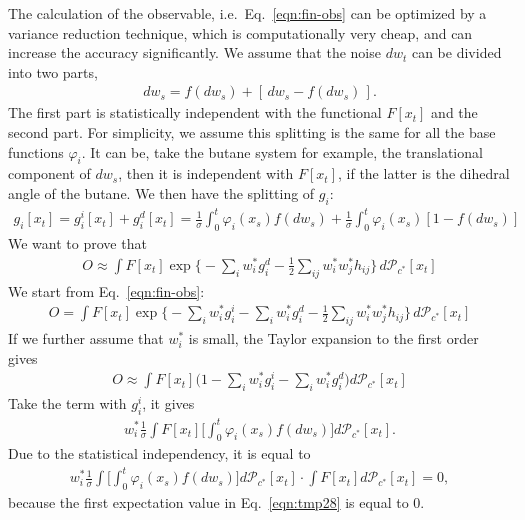 \documentclass[aip,jcp,a4paper,reprint,onecolumn]{revtex4-1}
\newcommand{\pathmeas}{d\mathcal P}
\begin{document}
The calculation of the observable, i.e.~Eq.~\eqref{eqn:fin-obs} can be
optimized by a variance reduction technique, which is computationally
very cheap, and can increase the accuracy significantly. We assume
that the noise $dw_t$ can be divided into two parts,
\begin{align}
  dw_s = f(dw_s) + [\,dw_s - f(dw_s)\,].
\end{align}
The first part is statistically independent with the functional
$F[x_t]$ and the second part. For simplicity, we assume this splitting
is the same for all the base functions $\varphi_i$. It can be, take the
butane system for example, the translational component of $dw_s$, then
it is independent with $F[x_t]$, if the latter is the dihedral angle
of the butane.  We then have the splitting of $g_i$:
\begin{align}
  g_i[x_t]
  = g_i^i[x_t] + g_i^d[x_t]
  = \frac1\sigma\int_0^t\varphi_i(x_s) f(dw_s)
  + \frac1\sigma\int_0^t\varphi_i(x_s) [1 - f(dw_s)]
\end{align}
We want to prove that
\begin{align}\label{eqn:o-approx}
  O \approx \int F[x_t]
  \exp\Big\{
  -\sum_iw^\ast_i g^d_i -\frac12\sum_{ij}w^\ast_iw^\ast_jh_{ij}
  \Big\}\,
  \pathmeas_{c^\ast}[x_t]    
\end{align}
We start from Eq.~\eqref{eqn:fin-obs}:
\begin{align}
  O = \int F[x_t]
  \exp\Big\{
  -\sum_i w^\ast_ig^i_i
  -\sum_iw^\ast_i g^d_i -\frac12\sum_{ij}w^\ast_iw^\ast_jh_{ij}
  \Big\}\,
  \pathmeas_{c^\ast}[x_t]  
\end{align}
If we further assume that $w_i^\ast$ is small, the Taylor expansion to
the first order gives
\begin{align}
  O \approx \int F[x_t]
  \Big( 1 - \sum_i w_i^\ast g_i^i   -\sum_iw^\ast_i g^d_i\Big)
  \pathmeas_{c^\ast}[x_t]    
\end{align}
Take the term with $g_i^i$, it gives
\begin{align}
  w_i^\ast \frac1\sigma
  \int F[x_t] 
  \Big[ \int_0^t\varphi_i(x_s)f(dw_s)
  \Big]
  \pathmeas_{c^\ast}[x_t].
\end{align}
Due to the statistical independency, it is equal to
\begin{align}\label{eqn:tmp28}
  w_i^\ast \frac1\sigma
  \int
    \Big[ \int_0^t\varphi_i(x_s)f(dw_s)
  \Big]
  \pathmeas_{c^\ast}[x_t]
  \cdot
  \int F[x_t] 
  \pathmeas_{c^\ast}[x_t] = 0, 
\end{align}
because the first expectation value in Eq.~\eqref{eqn:tmp28} is equal to 0.
\end{document}
